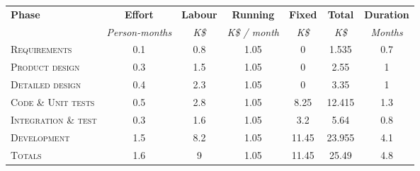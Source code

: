 \begin{tabular}{l|ccccc|c}
\multirow{2}{*}{\textbf{Phase}} & \textbf{Effort} & \textbf{Labour} & \textbf{Running} & \textbf{Fixed} & \textbf{Total} & \textbf{Duration} \\
& \textit{Person-months} & \textit{K\$} & \textit{K\$ / month} & \textit{K\$} & \textit{K\$} & \textit{Months} \\
\textsc{Requirements} & 0.1 & 0.8 & 1.05 & 0 & 1.535 & 0.7 \\
\textsc{Product design} & 0.3 & 1.5 & 1.05 & 0 & 2.55 & 1 \\
\textsc{Detailed design} & 0.4 & 2.3 & 1.05 & 0 & 3.35 & 1 \\
\textsc{Code \& Unit tests} & 0.5 & 2.8 & 1.05 & 8.25 & 12.415 & 1.3 \\
\textsc{Integration \& test} & 0.3 & 1.6 & 1.05 & 3.2 & 5.64 & 0.8 \\ \hline
\textsc{Development} & 1.5 & 8.2 & 1.05 & 11.45 & 23.955 & 4.1 \\
\textsc{Totals} & 1.6 & 9 & 1.05 & 11.45 & 25.49 & 4.8
\end{tabular}
